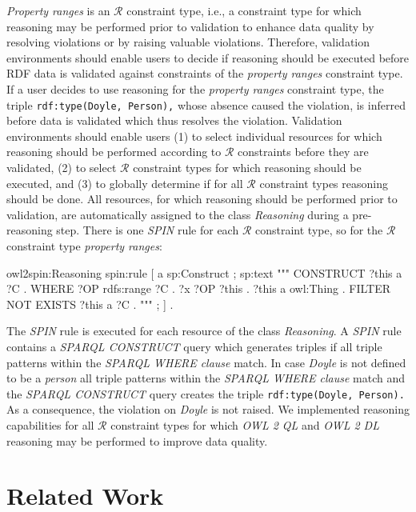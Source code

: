 \documentclass{acm_proc_article-sp}
\newcommand{\ms}[1]{%
  \texttt{#1}
}
\begin{document}
\emph{Property ranges} is an $\mathcal{R}$ constraint type, i.e., a constraint type 
for which reasoning may be performed prior to validation to enhance data quality by resolving violations or by raising valuable violations.
Therefore, validation environments should enable users to decide if reasoning should be executed before RDF data is validated against constraints of the \emph{property ranges} constraint type. 
If a user decides to use reasoning for the \emph{property ranges} constraint type, 
the triple {\small\ms{rdf:type(Doyle, Person),}} whose absence caused the violation, is inferred before data is validated which thus resolves the violation. 
Validation environments should enable users
(1) to select individual resources for which reasoning should be performed according to $\mathcal{R}$ constraints before they are validated,
(2) to select $\mathcal{R}$ constraint types for which reasoning should be executed, and
(3) to globally determine if for all $\mathcal{R}$ constraint types reasoning should be done. 
All resources, for which reasoning should be performed prior to validation, are automatically assigned to the class \emph{Reasoning} during a pre-reasoning step.
There is one \emph{SPIN} rule for each $\mathcal{R}$ constraint type, so for the $\mathcal{R}$ constraint type \emph{property ranges}:

\begin{ex}
owl2spin:Reasoning spin:rule [ a sp:Construct ; sp:text """
  CONSTRUCT { ?this a ?C . }
  WHERE { ?OP rdfs:range ?C . ?x ?OP ?this . ?this a owl:Thing .
    FILTER NOT EXISTS { ?this a ?C } . } """ ; ] .	
\end{ex}

The \emph{SPIN} rule is executed for each resource of the class \emph{Reasoning}.
A \emph{SPIN} rule contains a \emph{SPARQL CONSTRUCT} query which generates triples 
if all triple patterns within the \emph{SPARQL WHERE clause} match.
In case \emph{Doyle} is not defined to be a \emph{person} all triple patterns within the \emph{SPARQL WHERE clause} match and the \emph{SPARQL CONSTRUCT} query creates
the triple {\small\ms{rdf:type(Doyle, Person).}} As a consequence, the violation on \emph{Doyle} is not raised. 
We implemented reasoning capabilities for all $\mathcal{R}$ constraint types for which \emph{OWL 2 QL} and \emph{OWL 2 DL} reasoning may be performed to improve data quality.

\section{Related Work}
\label{sec:related-Work}
\end{document}
